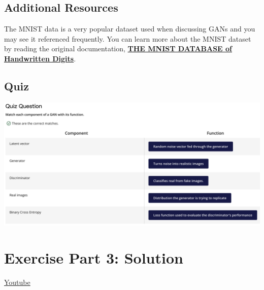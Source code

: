 \subsection{Additional Resources}
The MNIST data is a very popular dataset used when discussing GANs and you may see it referenced frequently. You can learn more about the MNIST dataset by reading the original documentation, \href{http://yann.lecun.com/exdb/mnist/}{\textbf{THE MNIST DATABASE of Handwritten Digits}}.

\subsection{Quiz}

\includegraphics[width=1\linewidth]{img//genAdvNet//gan/quiz3.png}


\section{Exercise Part 3: Solution}
\href{https://www.youtube.com/watch?v=HdhMtWz68Vo}{Youtube}
